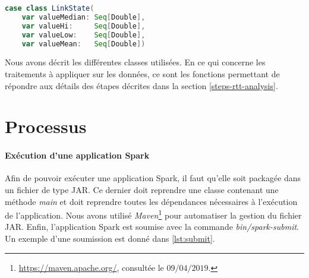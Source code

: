   

\begin{lstlisting}[language=scala, caption={La classe LinkState en Scala }]
case class LinkState(
	var valueMedian: Seq[Double],
	var valueHi:     Seq[Double],
	var valueLow:    Seq[Double],
	var valueMean:   Seq[Double])
\end{lstlisting}

Nous avons décrit les différentes classes utilisées. En ce qui concerne les traitements à appliquer sur les données, ce sont les fonctions permettant de répondre aux détails des étapes décrites dans la section  \ref{steps-rtt-analysis}.


\section{Processus}

\paragraph{Exécution d'une application Spark} Afin de pouvoir exécuter une application Spark, il faut qu'elle soit packagée dans un fichier de type JAR. Ce dernier doit reprendre une classe contenant une méthode \textit{main} et doit reprendre toutes les dépendances nécessaires à l'exécution de l'application. Nous avons utilisé \textit{Maven}\footnote{\url{https://maven.apache.org/}, consultée le $09/04/2019$.} pour automatiser la gestion du fichier JAR. Enfin, l'application Spark  est soumise avec la commande \textit{bin/spark-submit}. Un exemple d'une soumission est donné dans \ref{lst:submit}.

